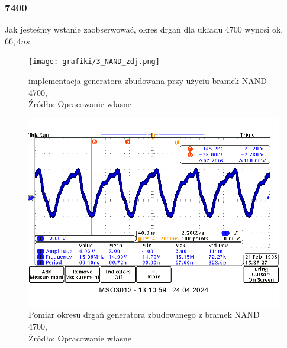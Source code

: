 \documentclass{article}
\begin{document}
    \subsubsection{7400}
      Jak jesteśmy wstanie zaobserwować, okres drgań dla układu 4700 wynosi ok. $66,4ns$. 
    \begin{figure}[!ht]
      \begin{minipage}{.5\textwidth}
        \centering
        \texttt{[image: grafiki/3\_NAND\_zdj.png]}
        \caption{implementacja generatora zbudowana przy użyciu bramek NAND 4700,
        \\Źródło: Opracowanie własne}
      \end{minipage}
      \begin{minipage}{.5\textwidth}
      \centering
      \includegraphics[scale=0.35]{grafiki/7400_pomiar.png}
      \caption{Pomiar okresu drgań generatora zbudowanego z bramek NAND 4700,
      \\Źródło: Opracowanie własne}
      \end{minipage}

    \end{figure}
\end{document}
